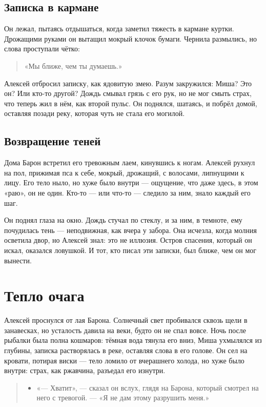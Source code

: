 \documentclass[12pt,a4paper]{book}
\newenvironment{dialogue}{\begin{quote}\itshape\begin{itemize}\item[]}{\end{itemize}\end{quote}}
\begin{document}
\section{Записка в кармане}

Он лежал, пытаясь отдышаться, когда заметил тяжесть в кармане куртки. Дрожащими руками он вытащил мокрый клочок бумаги. Чернила размылись, но слова проступали чётко:

\begin{quote}
«Мы ближе, чем ты думаешь.»
\end{quote}

Алексей отбросил записку, как ядовитую змею. Разум закружился: Миша? Это он? Или кто-то другой? Дождь смывал грязь с его рук, но не мог смыть страх, что теперь жил в нём, как второй пульс. Он поднялся, шатаясь, и побрёл домой, оставляя позади реку, которая чуть не стала его могилой.

\section{Возвращение теней}

Дома Барон встретил его тревожным лаем, кинувшись к ногам. Алексей рухнул на пол, прижимая пса к себе, мокрый, дрожащий, с волосами, липнущими к лицу. Его тело ныло, но хуже было внутри — ощущение, что даже здесь, в этом «раю», он не один. Кто-то — или что-то — следило за ним, знало каждый его шаг. 

Он поднял глаза на окно. Дождь стучал по стеклу, и за ним, в темноте, ему почудилась тень — неподвижная, как вчера у забора. Она исчезла, когда молния осветила двор, но Алексей знал: это не иллюзия. Остров спасения, который он искал, оказался ловушкой. И тот, кто писал эти записки, был ближе, чем он мог вынести.

\chapter{Тепло очага}

Алексей проснулся от лая Барона. Солнечный свет пробивался сквозь щели в занавесках, но усталость давила на веки, будто он не спал вовсе. Ночь после рыбалки была полна кошмаров: тёмная вода тянула его вниз, Миша ухмылялся из глубины, записка растворялась в реке, оставляя слова в его голове. Он сел на кровати, потирая виски — тело ломило от вчерашнего холода, но хуже было внутри: страх, как ржавчина, разъедал его изнутри.

\begin{dialogue}
«— Хватит», — сказал он вслух, глядя на Барона, который смотрел на него с тревогой. — «Я не дам этому разрушить меня.»
\end{dialogue}
\end{document}
